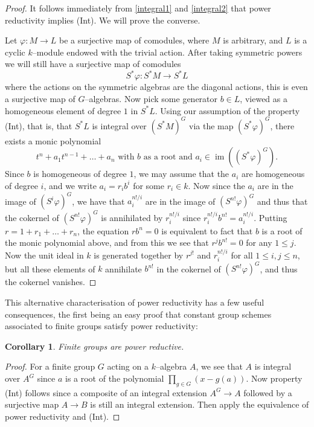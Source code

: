 \documentclass{article}
\theoremstyle{plain}
\newtheorem{Cor}[Th]{Corollary}
\theoremstyle{definition}
\DeclareMathOperator{\im}{im}
\begin{document}
\begin{proof}
  It follows immediately from \ref{integral1} and \ref{integral2} that power reductivity implies (Int). We will prove the converse.
  
  Let $\varphi\colon M\to L$ be a surjective map of comodules, where $M$ is arbitrary, and $L$ is a cyclic $k$--module endowed with the trivial action. After taking symmetric powers we will still have a surjective map of comodules 
  \[
  S^*\varphi\colon  S^*M\to S^*L
  \]
   where the actions on the symmetric algebras are the diagonal actions, this is even a surjective map of $G$--algebras. Now pick some generator $b\in L$, viewed as a homogeneous element of degree $1$ in $S^*L$. Using our assumption of the property (Int), that is, that $S^*L$ is integral over $(S^*M)^G$ via the map $(S^*\varphi)^G$, there exists a monic polynomial
   \[
   t^n + a_1t^{n-1} + \dots +a_n \textrm{ with } b \textrm{ as a root and } a_i\in \im((S^*\varphi)^G).
   \]
   Since $b$ is homogeneous of degree $1$, we may assume that the $a_i$ are homogeneous of degree $i$, and we write $a_i=r_ib^i$ for some $r_i\in k$. Now since the $a_i$ are in the image of $(S^i\varphi)^G$, we have that $a_i^{n!/i}$ are in the image of $(S^{n!}\varphi)^G$ and thus that the cokernel of $(S^{n!}\varphi)^G$ is annihilated by $r_i^{n!/i}$ since $r_i^{n!/i}b^{n!}=a_i^{n!/i}$. Putting $r=1+r_1+\dots+r_n$, the equation $rb^n=0$ is equivalent to fact that $b$ is a root of the monic polynomial above, and from this we see that $r^{j}b^{n!}=0$ for any $1\leq j$. Now the unit ideal in $k$ is generated together by $r^{j!}$ and $r_i^{n!/i}$ for all $1 \leq i, j \leq n$, but all these elements of $k$ annihilate $b^{n!}$ in the cokernel of $(S^{n!}\varphi)^G$, and thus the cokernel vanishes.
\end{proof}

This alternative characterisation of power reductivity has a few useful consequences, the first being an easy proof that constant group schemes associated to finite groups satisfy power reductivity:

\begin{Cor}
    Finite groups are power reductive.
\end{Cor}

\begin{proof}
    For a finite group $G$ acting on a $k$--algebra $A$, we see that $A$ is integral over $A^G$ since $a$ is a root of the polynomial $\prod_{g\in G}(x- g(a))$. Now property (Int) follows since a composite of an integral extension $A^G\to A$ followed by a surjective map $A\to B$ is still an integral extension. Then apply the equivalence of power reductivity and (Int).
\end{proof}
\end{document}
